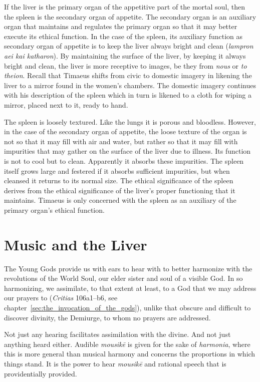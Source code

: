 If the liver is the primary organ of the appetitive part of the mortal soul, then the spleen is the secondary organ of appetite. The secondary organ is an auxiliary organ that maintains and regulates the primary organ so that it may better execute its ethical function. In the case of the spleen, its auxiliary function as secondary organ of appetite is to keep the liver always bright and clean (\emph{lampron aei kai katharon}). By maintaining the surface of the liver, by keeping it always bright and clean, the liver is more receptive to images, be they from \emph{nous} or \emph{to theion}. Recall that Timaeus shifts from civic to domestic imagery in likening the liver to a mirror found in the women's chambers. The domestic imagery continues with his description of the spleen which in turn is likened to a cloth for wiping a mirror, placed next to it, ready to hand.

The spleen is loosely textured. Like the lungs it is porous and bloodless. However, in the case of the secondary organ of appetite, the loose texture of the organ is not so that it may fill with air and water, but rather so that it may fill with impurities that may gather on the surface of the liver due to illness. Its function is not to cool but to clean. Apparently it absorbs these impurities. The spleen itself grows large and festered if it absorbs sufficient impurities, but when cleansed it returns to its normal size. The ethical significance of the spleen derives from the ethical significance of the liver's proper functioning that it maintains. Timaeus is only concerned with the spleen as an auxiliary of the primary organ's ethical function.


\section{Music and the Liver} %
\label{sec:audition_and_the_liver}

The Young Gods provide us with ears to hear with to better harmonize with the revolutions of the World Soul, our elder sister and soul of a visible God. In so harmonizing, we assimilate, to that extent at least, to a God that we may address our prayers to (\emph{Critias} 106a1–b6, see chapter~\ref{sec:the_invocation_of_the_gods}), unlike that obscure and difficult to discover divinity, the Demiurge, to whom no prayers are addressed.

Not just any hearing facilitates assimilation with the divine. And not just anything heard either. Audible \emph{mousikē} is given for the sake of \emph{harmonia}, where this is more general than musical harmony and concerns the proportions in which things stand. It is the power to hear \emph{mousikē} and rational speech that is providentially provided.

